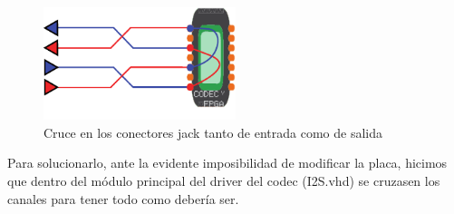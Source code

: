 \begin{figure}[H]
\begin{center}
	\includegraphics[width=0.5\textwidth]{./swapping_channels-eps-converted-to}
\caption{Cruce en los conectores jack tanto de entrada como de salida}
\end{center}
\end{figure}

Para solucionarlo, ante la evidente imposibilidad de modificar la placa, hicimos que dentro del módulo principal del driver del codec (I2S.vhd) se cruzasen los canales para tener todo como debería ser.
		
	

	

